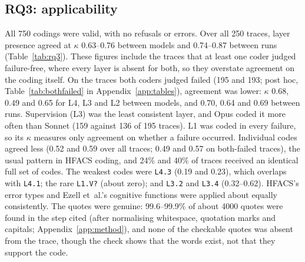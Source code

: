 \documentclass[10pt]{article}
\newcommand{\code}[1]{\texttt{#1}}
\begin{document}
\subsection{RQ3: applicability}

All 750 codings were valid, with no refusals or errors. Over all 250 traces, layer presence agreed at $\kappa$ 0.63--0.76 between models and 0.74--0.87 between runs (Table~\ref{tab:rq3}). These figures include the traces that at least one coder judged failure-free, where every layer is absent for both, so they overstate agreement on the coding itself. On the traces both coders judged failed (195 and 193; post hoc, Table~\ref{tab:bothfailed} in Appendix~\ref{app:tables}), agreement was lower: $\kappa$ 0.68, 0.49 and 0.65 for L4, L3 and L2 between models, and 0.70, 0.64 and 0.69 between runs. Supervision (L3) was the least consistent layer, and Opus coded it more often than Sonnet (159 against 136 of 195 traces). L1 was coded in every failure, so its $\kappa$ measures only agreement on whether a failure occurred. Individual codes agreed less (0.52 and 0.59 over all traces; 0.49 and 0.57 on both-failed traces), the usual pattern in HFACS coding, and 24\% and 40\% of traces received an identical full set of codes. The weakest codes were \code{L4.3} (0.19 and 0.23), which overlaps with
\code{L4.1}; the rare \code{L1.V?} (about zero); and \code{L3.2} and \code{L3.4}
(0.32--0.62). HFACS's error types and Ezell et~al.'s cognitive functions were
applied about equally consistently. The quotes were genuine: 99.6--99.9\% of about
\num{4000} quotes were found in the step cited (after normalising whitespace,
quotation marks and capitals; Appendix~\ref{app:method}), and none of the checkable
quotes was absent from the trace, though the check shows that the words exist, not
that they support the code.
\end{document}
